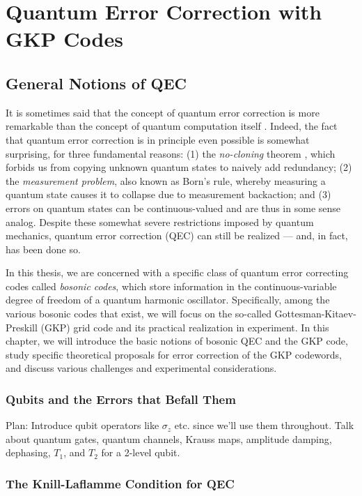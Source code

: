 \chapter{Quantum Error Correction with GKP Codes\label{ch:2_QEC}}

\section{General Notions of QEC}
It is sometimes said that the concept of quantum error correction is more remarkable than the concept of quantum computation itself \cite{girvin2019QECvideo}. Indeed, the fact that quantum error correction is in principle even possible is somewhat surprising, for three fundamental reasons: (1) the \textit{no-cloning} theorem \cite{ike-and-mike}, which forbids us from copying unknown quantum states to naively add redundancy; (2) the \textit{measurement problem}, also known as Born's rule, whereby measuring a quantum state causes it to collapse due to measurement backaction; and (3) errors on quantum states can be continuous-valued and are thus in some sense analog. Despite these somewhat severe restrictions imposed by quantum mechanics, quantum error correction (QEC) can still be realized --- and, in fact, has been done so.


In this thesis, we are concerned with a specific class of quantum error correcting codes called \textit{bosonic codes}, which store information in the continuous-variable degree of freedom of a quantum harmonic oscillator. Specifically, among the various bosonic codes that exist, we will focus on the so-called Gottesman-Kitaev-Preskill (GKP) grid code and its practical realization in experiment. In this chapter, we will introduce the basic notions of bosonic QEC and the GKP code, study specific theoretical proposals for error correction of the GKP codewords, and discuss various challenges and experimental considerations.


\subsection{Qubits and the Errors that Befall Them}

 Plan: Introduce qubit operators like $\sigma_z$ etc. since we'll use them throughout. Talk about quantum gates, quantum channels, Krauss maps, amplitude damping, dephasing, $T_1$, and $T_2$ for a 2-level qubit. 


\subsection{The Knill-Laflamme Condition for QEC}

